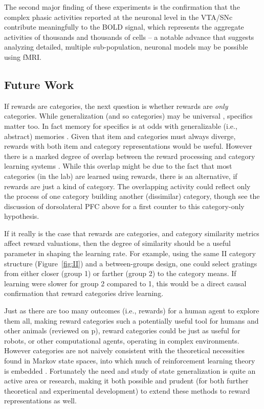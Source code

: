 The second major finding of these experiments is the confirmation that the complex phasic activities reported at the neuronal level in the VTA/SNc \cite{Kim:2006p1063, Matsumoto:2009p7219,Smith:2011p9101} contribute meaningfully to the BOLD signal, which represents the aggregate activities of thousands and thousands of cells -- a notable advance that suggests analyzing detailed, multiple sub-population, neuronal models may be possible using fMRI.

\subsection{Future Work}
\label{sub:future}
If rewards are categories, the next question is whether rewards are \emph{only} categories.  While generalization (and so categories) may be universal \cite{Shepard:1987p9102}, specifics matter too.  In fact memory for specifics is at odds with generalizable (i.e., abstract) memories \cite{Atallah:2004p5466}. Given that item and categories must always diverge, rewards with both item and category representations would be useful.  However there is a marked degree of overlap between the reward processing and category learning systems \cite{Seger:2010p7189,Ashby:2011p9148}.  While this overlap might be due to the fact that most categories (in the lab) are learned using rewards, there is an alternative, if rewards are just a kind of category.  The overlapping activity could reflect only the process of one category building another (dissimilar) category, though see the discussion of dorsolateral PFC above for a first counter to this category-only hypothesis.

If it really is the case that rewards are categories, and category similarity metrics affect reward valuations, then the degree of similarity should be a useful parameter in shaping the learning rate.  For example, using the same II category structure (Figure~\ref{fig:II}) and a between-groups design, one could select gratings from either closer (group 1) or farther (group 2) to the category means. If learning were slower for group 2 compared to 1, this would be a direct causal confirmation that reward categories drive learning. 

Just as there are too many outcomes (i.e., rewards) for a human agent to explore them all, making reward categories such a potentially useful tool for humans and other animals (reviewed on p\pageref{sub:gen}), reward categories could be just as useful for robots, or other computational agents, operating in complex environments.   However categories are not naively consistent with the theoretical necessities found in Markov state spaces, into which much of reinforcement learning theory is embedded \cite{Sutton:1998p9247}.  Fortunately the need and study of state generalization is quite an active area or research, making it both possible and prudent (for both further theoretical and experimental development) to extend these methods to reward representations as well. 
\clearpage
